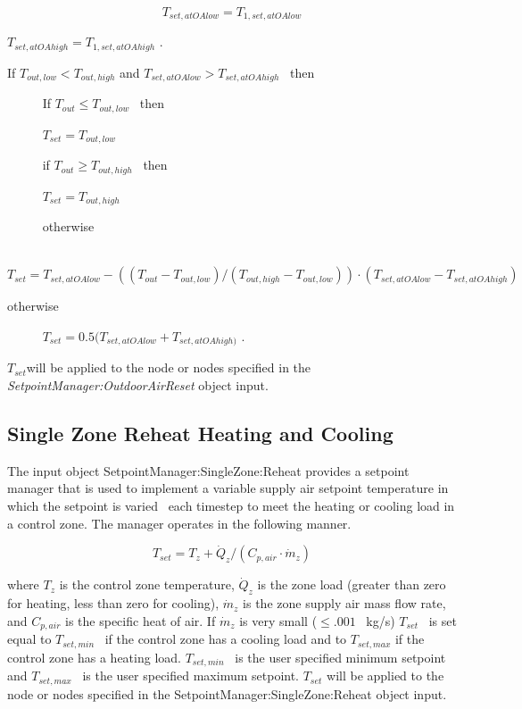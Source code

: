 \begin{equation}
{T_{set,atOAlow}} = {T_{1,set,atOAlow}}
\end{equation}

\({T_{set,atOAhigh}} = {T_{1,set,atOAhigh}}\) .

If \({T_{out,low}} < {T_{out,high}}\) and \({T_{set,atOAlow}} > {T_{set,atOAhigh}}\) ~then

~~~~~ If \({T_{out}} \le {T_{out,low}}\) ~then

~~~~~ \({T_{set}} = {T_{out,low}}\)

~~~~~ if \({T_{out}} \ge {T_{out,high}}\) ~then

~~~~~ \({T_{set}} = {T_{out,high}}\)

~~~~~ otherwise

~~~~~ \({T_{set}} = {T_{set,atOAlow}} - (({T_{out}} - {T_{out,low}})/({T_{out,high}} - {T_{out,low}}))\cdot ({T_{set,atOAlow}} - {T_{set,atOAhigh}})\)

otherwise

~~~~~ \({T_{set}} = 0.5({T_{set,atOAlow}} + {T_{set,atOAhigh)}}\) .

\emph{\({T_{set}}\)}will be applied to the node or nodes specified in the \emph{SetpointManager:OutdoorAirReset} object input.

\subsection{Single Zone Reheat Heating and Cooling}\label{single-zone-reheat-heating-and-cooling}

The input object SetpointManager:SingleZone:Reheat provides a setpoint manager that is used to implement a variable supply air setpoint temperature in which the setpoint is varied~ each timestep to meet the heating or cooling load in a control zone. The manager operates in the following manner.

\begin{equation}
{T_{set}} = {T_z} + {\dot Q_z}/({C_{p,air}}\cdot {\dot m_z})
\end{equation}

where \({T_z}\) is the control zone temperature, \({\dot Q_z}\) is the zone load (greater than zero for heating, less than zero for cooling), \({\dot m_z}\) is the zone supply air mass flow rate, and \({C_{p,air}}\) is the specific heat of air. If \({\dot m_z}\) is very small (\(\le .001\) ~kg/s) \({T_{set}}\) ~is set equal to \({T_{set,min}}\) ~if the control zone has a cooling load and to \({T_{set,max}}\) if the control zone has a heating load. \({T_{set,min}}\) ~is the user specified minimum setpoint and \({T_{set,max}}\) ~is the user specified maximum setpoint. \({T_{set}}\) will be applied to the node or nodes specified in the SetpointManager:SingleZone:Reheat object input.

